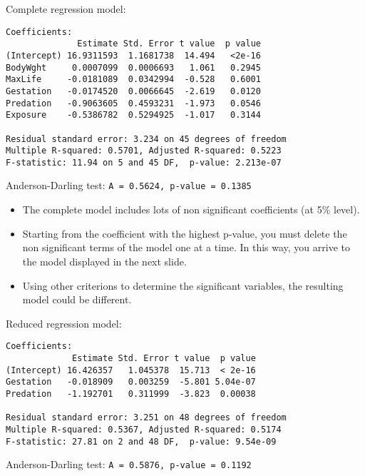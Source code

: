 \begin{frame}[fragile]
  Complete regression model:
  \begin{small}
    \begin{verbatim}
Coefficients:
              Estimate Std. Error t value  p value    
(Intercept) 16.9311593  1.1681738  14.494   <2e-16
BodyWght     0.0007099  0.0006693   1.061   0.2945    
MaxLife     -0.0181089  0.0342994  -0.528   0.6001    
Gestation   -0.0174520  0.0066645  -2.619   0.0120
Predation   -0.9063605  0.4593231  -1.973   0.0546
Exposure    -0.5386782  0.5294925  -1.017   0.3144 

Residual standard error: 3.234 on 45 degrees of freedom
Multiple R-squared: 0.5701,	Adjusted R-squared: 0.5223 
F-statistic: 11.94 on 5 and 45 DF,  p-value: 2.213e-07 
    \end{verbatim}
  \end{small}
  \vspace{-0.2cm}
  Anderson-Darling test: \verb+A = 0.5624, p-value = 0.1385+
\end{frame}

\begin{frame}
  \vspace{0.75cm}
  \begin{itemize}
\item The complete model includes lots of non significant coefficients (at 5\% level).
    \vspace{0.75cm}
    \item Starting from the coefficient with the highest p-value, you must delete the non significant terms of the model one at a time. In this way, you arrive to the model displayed in the next slide.
    \vspace{0.75cm}
    \item Using other criterions to determine the significant variables, the resulting model could be different.
  \end{itemize}
\end{frame}

\begin{frame}[fragile]
  Reduced regression model:
  \begin{small}
    \begin{verbatim}
Coefficients:
             Estimate Std. Error t value  p value   
(Intercept) 16.426357   1.045378  15.713  < 2e-16
Gestation   -0.018909   0.003259  -5.801 5.04e-07
Predation   -1.192701   0.311999  -3.823  0.00038

Residual standard error: 3.251 on 48 degrees of freedom
Multiple R-squared: 0.5367,	Adjusted R-squared: 0.5174 
F-statistic: 27.81 on 2 and 48 DF,  p-value: 9.54e-09 

    \end{verbatim}
  \end{small}
  \begin{small}
    Anderson-Darling test: \verb+A = 0.5876, p-value = 0.1192+
  \end{small}
\end{frame}

